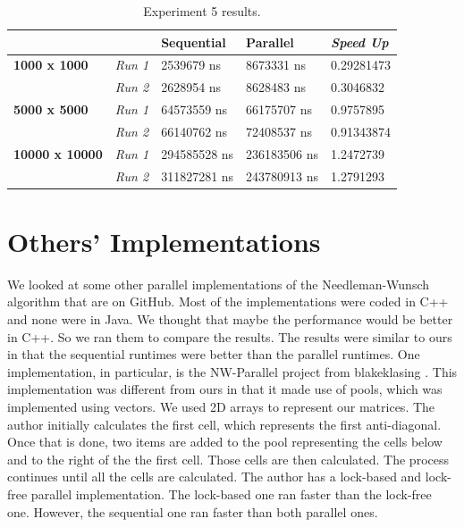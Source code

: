 \documentclass[conference]{IEEEtran}
\begin{document}
\begin{table}[]
\caption{Experiment 5 results.}
\label{tab:table5}
\begin{tabular}{|l|l|l|l|l|}
\hline
               & \textbf{}      & \textbf{Sequential} & \textbf{Parallel} & \textit{\textbf{Speed Up}} \\ \hline
\textbf{1000 x 1000}   & \textit{Run 1} & 2539679 ns   & 8673331 ns   & 0.29281473 \\ \hline
              & \textit{Run 2} & 2628954 ns   & 8628483 ns   & 0.3046832  \\ \hline
\textbf{5000 x 5000}   & \textit{Run 1} & 64573559 ns  & 66175707 ns  & 0.9757895  \\ \hline
              & \textit{Run 2} & 66140762 ns  & 72408537 ns  & 0.91343874 \\ \hline
\textbf{10000 x 10000} & \textit{Run 1} & 294585528 ns & 236183506 ns & 1.2472739  \\ \hline
              & \textit{Run 2} & 311827281 ns & 243780913 ns & 1.2791293  \\ \hline
\end{tabular}
\end{table}

\section{Others' Implementations}
We looked at some other parallel implementations of the Needleman-Wunsch algorithm that are on GitHub. Most of the implementations were coded in C++ and none were in Java. We thought that maybe the performance would be better in C++. So we ran them to compare the results. The results were similar to ours in that the sequential runtimes were better than the parallel runtimes. One implementation, in particular, is the NW-Parallel project from blakeklasing \cite{blakeklasing}. This implementation was different from ours in that it made use of pools, which was implemented using vectors. We used 2D arrays to represent our matrices. The author initially calculates the first cell, which represents the first anti-diagonal. Once that is done, two items are added to the pool representing the cells below and to the right of the the first cell. Those cells are then calculated. The process continues until all the cells are calculated. The author has a lock-based and lock-free parallel implementation. The lock-based one ran faster than the lock-free one. However, the sequential one ran faster than both parallel ones.
\end{document}
